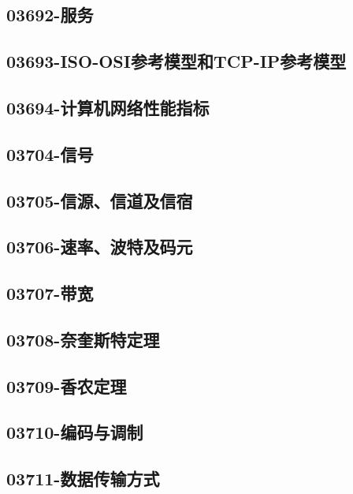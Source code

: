 \subsection{03692-服务}

\subsection{03693-ISO-OSI参考模型和TCP-IP参考模型}

\subsection{03694-计算机网络性能指标}

\subsection{03704-信号}

\subsection{03705-信源、信道及信宿}

\subsection{03706-速率、波特及码元}

\subsection{03707-带宽}

\subsection{03708-奈奎斯特定理}

\subsection{03709-香农定理}

\subsection{03710-编码与调制}

\subsection{03711-数据传输方式}

